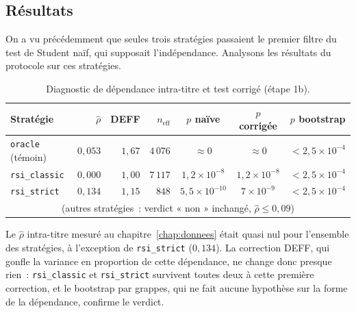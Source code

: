 \subsection{Résultats}

On a vu précédemment que seules trois stratégies passaient le premier filtre
du test de Student naïf, qui supposait l'indépendance. Analysons les résultats
du protocole sur ces stratégies.

\begin{table}[H]
\centering
\caption{Diagnostic de dépendance intra-titre et test corrigé (étape 1b).}
\label{tab:b1-dep-deff}
\small
\begin{tabular}{@{}lrrrccc@{}}
\toprule
Stratégie & $\hat\rho$ & DEFF & $n_{\text{eff}}$ & $p$ naïve & $p$ corrigée & $p$ bootstrap \\
\midrule
\texttt{oracle} (témoin) & $0{,}053$ & $1{,}67$ & $4\,076$ & $\approx 0$ & $\approx 0$ & $<2{,}5\times10^{-4}$ \\
\midrule
\texttt{rsi\_classic} & $0{,}000$ & $1{,}00$ & $7\,117$ & $1{,}2\times10^{-8}$ & $1{,}2\times10^{-8}$ & $<2{,}5\times10^{-4}$ \\
\texttt{rsi\_strict}  & $0{,}134$ & $1{,}15$ & $848$    & $5{,}5\times10^{-10}$ & $7\times10^{-9}$     & $<2{,}5\times10^{-4}$ \\
\multicolumn{7}{c}{\footnotesize (autres stratégies~: verdict « non » inchangé, $\hat\rho \le 0{,}09$)} \\
\bottomrule
\end{tabular}
\end{table}

Le $\hat\rho$ intra-titre mesuré au chapitre~\ref{chap:donnees} était quasi nul
pour l'ensemble des stratégies, à l'exception de \texttt{rsi\_strict}
($0{,}134$). La correction DEFF, qui gonfle la variance en proportion de
cette dépendance, ne change donc presque rien~: \texttt{rsi\_classic} et
\texttt{rsi\_strict} survivent toutes deux à cette première correction, et le
bootstrap par grappes, qui ne fait aucune hypothèse sur la forme de la
dépendance, confirme le verdict.

